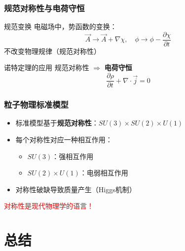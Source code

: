\documentclass[xcolor=dvipsnames]{ctexbeamer}
\begin{document}
\begin{frame}
\frametitle{规范对称性与电荷守恒}
\begin{block}{规范变换}
电磁场中，势函数的变换：
$$\vec{A} \to \vec{A} + \nabla\chi, \quad \phi \to \phi - \frac{\partial \chi}{\partial t}$$
不改变物理规律（规范对称性）
\end{block}

\pause

\begin{alertblock}{诺特定理的应用}
规范对称性 $\Rightarrow$ \textbf{电荷守恒}
$$\frac{\partial \rho}{\partial t} + \nabla \cdot \vec{j} = 0$$
\end{alertblock}
\end{frame}

\begin{frame}
\frametitle{粒子物理标准模型}
\begin{itemize}
\item 标准模型基于\textbf{规范对称性}：$SU(3) \times SU(2) \times U(1)$
\pause
\item 每个对称性对应一种相互作用：
\begin{itemize}
\item $SU(3)$：强相互作用
\item $SU(2) \times U(1)$：电弱相互作用
\end{itemize}
\pause
\item 对称性破缺导致质量产生（Higgs机制）
\end{itemize}

\vspace{1em}
\pause

\begin{center}
\Large \textcolor{red}{对称性是现代物理学的语言！}
\end{center}
\end{frame}

\section{总结}
\end{document}
